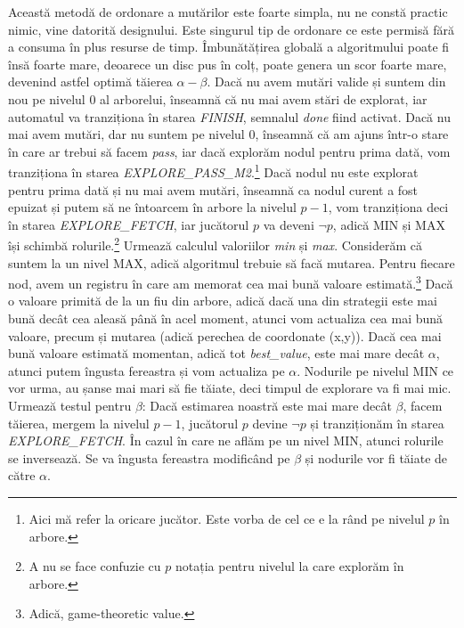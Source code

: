 \documentclass[12pt,twoside,a4paper,fleqn]{book}
\theoremstyle{definition}
\begin{document}
Această metodă de ordonare a mutărilor este foarte simpla, nu ne constă practic nimic, vine datorită designului. Este singurul tip de ordonare ce este permisă fără a consuma în plus resurse de timp. Îmbunătățirea globală a algoritmului poate fi însă foarte mare, deoarece un disc pus în colț, poate genera un scor foarte mare, devenind astfel optimă tăierea $\alpha-\beta$. Dacă nu avem mutări valide și suntem din nou pe nivelul $0$ al arborelui, înseamnă că nu mai avem stări de explorat, iar automatul va tranziționa în starea \emph{FINISH}, semnalul \emph{done} fiind activat. Dacă nu mai avem mutări, dar nu suntem pe nivelul $0$, înseamnă că am ajuns într-o stare în care ar trebui să facem \emph{pass}, iar dacă explorăm nodul pentru prima dată, vom tranziționa în starea \emph{EXPLORE\_PASS\_M2}.\footnote{Aici mă refer la oricare jucător. Este vorba de cel ce e la rând pe nivelul $p$ în arbore.} Dacă nodul nu este explorat pentru prima dată și nu mai avem mutări, înseamnă ca nodul curent a fost epuizat și putem să ne întoarcem în arbore la nivelul $p-1$, vom tranziționa deci în starea \emph{EXPLORE\_FETCH}, iar jucătorul $p$ va deveni $\lnot p$, adică MIN și MAX își schimbă rolurile.\footnote{A nu se face confuzie cu $p$ notația pentru nivelul la care explorăm în arbore.} Urmează calculul valoriilor \emph{min} și \emph{max}. Considerăm că suntem la un nivel MAX, adică algoritmul trebuie să facă mutarea. Pentru fiecare nod, avem un registru în care am memorat cea mai bună valoare estimată.\footnote{Adică, game-theoretic value.} Dacă o valoare primită de la un fiu din arbore, adică dacă una din strategii este mai bună decât cea aleasă până în acel moment, atunci vom actualiza cea mai bună valoare, precum și mutarea (adică perechea de coordonate (x,y)). Dacă cea mai bună valoare  estimată momentan, adică tot \emph{best\_value}, este mai mare decât $\alpha$, atunci putem îngusta fereastra și vom actualiza pe $\alpha$. Nodurile pe nivelul MIN ce vor urma, au șanse mai mari să fie tăiate, deci timpul de explorare va fi mai mic. Urmează testul pentru $\beta$: Dacă estimarea noastră este mai mare decât $\beta$, facem tăierea, mergem la nivelul $p-1$, jucătorul $p$ devine $\lnot p$ și tranziționăm în starea \emph{EXPLORE\_FETCH}. În cazul în care ne aflăm pe un nivel MIN, atunci rolurile se inversează. Se va îngusta fereastra modificând pe $\beta$ și nodurile vor fi tăiate de către $\alpha$.
\end{document}
